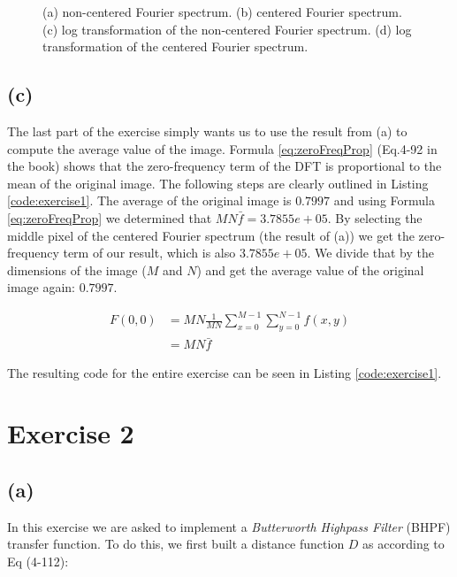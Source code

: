 \documentclass{article}
\begin{document}
\begin{figure}[ht]
    \centering
    
    \caption{(a) non-centered Fourier spectrum. (b) centered Fourier spectrum. (c) log transformation of the non-centered Fourier spectrum. (d) log transformation of the centered Fourier spectrum.}
    \label{fig:exercise1}
\end{figure}

\subsection*{(c)}
The last part of the exercise simply wants us to use the result from (a) to compute the average value of the image. Formula \ref{eq:zeroFreqProp} (Eq.4-92 in the book) shows that the zero-frequency term of the DFT is proportional to the mean of the original image. The following steps are clearly outlined in  Listing \ref{code:exercise1}. The average of the original image is $0.7997$ and using Formula \ref{eq:zeroFreqProp} we determined that $M N \bar{f} = 3.7855e+05$. By selecting the middle pixel of the centered Fourier spectrum (the result of (a)) we get the zero-frequency term of our result, which is also $3.7855e+05$. We divide that by the dimensions of the image ($M$ and $N$) and get the average value of the original image again: $0.7997$.

\begin{equation}\label{eq:zeroFreqProp}
    \begin{aligned}
    F(0,0) &=M N \frac{1}{M N} \sum_{x=0}^{M-1} \sum_{y=0}^{N-1} f(x, y) \\
    &=M N \bar{f}
    \end{aligned}
\end{equation}

The resulting code for the entire exercise can be seen in  Listing \ref{code:exercise1}.

\newpage
\section*{Exercise 2}
\subsection*{(a)} In this exercise we are asked to implement a \textit{Butterworth Highpass Filter} (BHPF) transfer function. To do this, we first built a distance function $D$ as according to Eq (4-112):
\end{document}

